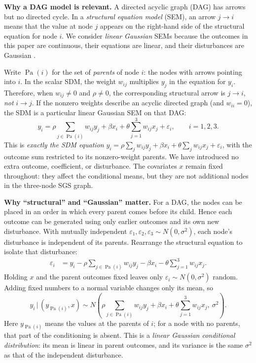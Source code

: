 \documentclass[11pt,a4paper]{article}
\newcommand{\given}{\,\vert\,}
\begin{document}
\textbf{Why a DAG model is relevant.} A directed acyclic graph (DAG) has arrows but no directed cycle. In a \emph{structural equation model} (SEM), an arrow $j\to i$ means that the value at node $j$ appears on the right-hand side of the structural equation for node $i$. We consider \emph{linear Gaussian} SEMs because the outcomes in this paper are continuous, their equations are linear, and their disturbances are Gaussian \cite{koller,peters}.

Write $\operatorname{Pa}(i)$ for the set of \emph{parents} of node $i$: the nodes with arrows pointing into $i$. In the scalar SDM, the weight $w_{ij}$ multiplies $y_j$ in the equation for $y_i$. Therefore, when $w_{ij}\ne0$ and $\rho\ne0$, the corresponding structural arrow is $j\to i$, \emph{not} $i\to j$. If the nonzero weights describe an acyclic directed graph (and $w_{ii}=0$), the SDM is a particular linear Gaussian SEM on that DAG:
\begin{equation}
\boxed{
 y_i=\rho\sum_{j\in\operatorname{Pa}(i)}w_{ij}y_j
     +\beta x_i+\theta\sum_{j=1}^3w_{ij}x_j+\varepsilon_i,
 \qquad i=1,2,3.}
\label{eq:sem}
\end{equation}
This is \emph{exactly the SDM equation} $y_i=\rho\sum_{j}w_{ij}y_j+\beta x_i+\theta\sum_jw_{ij}x_j+\varepsilon_i$, with the outcome sum restricted to its nonzero-weight parents. We have introduced no extra outcome, coefficient, or disturbance. The covariates $x$ remain fixed throughout: they affect the conditional means, but they are not additional nodes in the three-node SGS graph.

\textbf{Why ``structural'' and ``Gaussian'' matter.} For a DAG, the nodes can be placed in an order in which every parent comes before its child. Hence each outcome can be generated using only earlier outcomes and its own new disturbance. With mutually independent $\varepsilon_1,\varepsilon_2,\varepsilon_3\sim N(0,\sigma^2)$, each node's disturbance is independent of its parents. Rearrange the structural equation to isolate that disturbance:
\begin{align}
 \varepsilon_i
 &=y_i-\rho\sum_{j\in\operatorname{Pa}(i)}w_{ij}y_j
     -\beta x_i-\theta\sum_{j=1}^3w_{ij}x_j.\label{eq:semerror}
\end{align}
Holding $x$ and the parent outcomes fixed leaves only $\varepsilon_i\sim N(0,\sigma^2)$ random. Adding fixed numbers to a normal variable changes only its mean, so
\begin{equation}
 \boxed{
 y_i\given (y_{\operatorname{Pa}(i)},x)
 \sim N\!\left(\rho\sum_{j\in\operatorname{Pa}(i)}w_{ij}y_j
        +\beta x_i+\theta\sum_{j=1}^3w_{ij}x_j,\ \sigma^2\right).}
 \label{eq:semconditional}
\end{equation}
Here $y_{\operatorname{Pa}(i)}$ means the values at the parents of $i$; for a node with no parents, that part of the conditioning is absent. This is a \emph{linear Gaussian conditional distribution}: its mean is linear in parent outcomes, and its variance is the same $\sigma^2$ as that of the independent disturbance.
\end{document}
